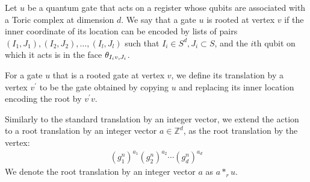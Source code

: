 \begin{definition}
  Let $u$ be a quantum gate that acts on a register whose qubits are associated with a Toric complex at dimension $d$. We say that a gate $u$ is rooted at vertex $v$ if the inner coordinate of its location can be encoded by lists of pairs $(I_{1}, J_{1}), (I_{2}, J_{2}), \ldots, (I_{l}, J_{l})$ such that $I_{i} \in S^{d}, J_{i} \subset S$, and the $i$th qubit on which it acts is in the face $\theta_{ I_{i} v  ,  J_{i}  }$.
\end{definition}

\begin{definition} 
  For a gate $u$ that is a rooted gate at vertex $v$, we define its translation by a vertex $v^{\prime}$ to be the gate obtained by copying $u$ and replacing its inner location encoding the root by $v^{\prime}v$. 

Similarly to the standard translation by an integer vector, we extend the action to a root translation by an integer vector $a \in \mathbb{Z}^{d}$, as the root translation by the vertex:
   \begin{equation*}
     \begin{split}
       (g_{1}^{n})^{a_{1}} (g_{2}^{n})^{a_{2}} \cdots (g_{d}^{n})^{a_{d}}
     \end{split}
   \end{equation*}
   We denote the root translation by an integer vector $a$ as $a *_{r} u$.
\end{definition}


